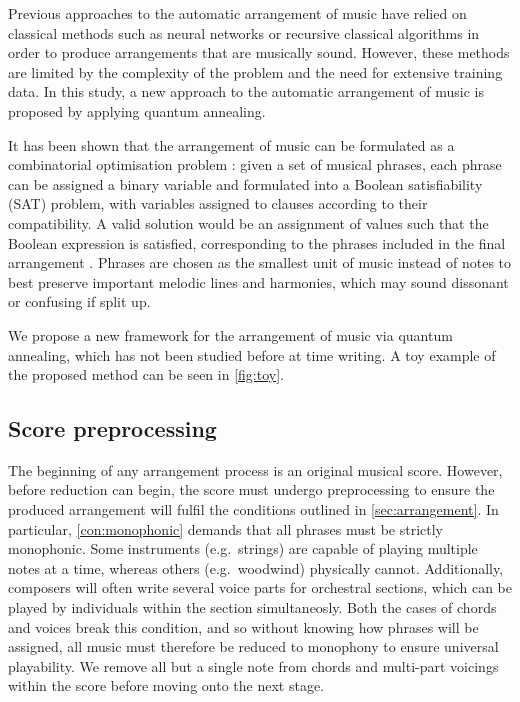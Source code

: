 \documentclass[12pt]{article}
\theoremstyle{definition}
\begin{document}
Previous approaches to the automatic arrangement of music have relied on classical methods such as neural networks  or recursive classical algorithms in order to produce arrangements that are musically sound. However, these methods are limited by the complexity of the problem and the need for extensive training data. In this study, a new approach to the automatic arrangement of music is proposed by applying quantum annealing.

It has been shown that the arrangement of music can be formulated as a combinatorial optimisation problem \cite{moses_computational_2016}: given a set of musical phrases, each phrase can be assigned a binary variable and formulated into a Boolean satisfiability (SAT) problem, with variables assigned to clauses according to their compatibility. A valid solution would be an assignment of values such that the Boolean expression is satisfied, corresponding to the phrases included in the final arrangement . Phrases are chosen as the smallest unit of music instead of notes to best preserve important melodic lines and harmonies, which may sound dissonant or confusing if split up.


We propose a new framework for the arrangement of music via quantum annealing, which has not been studied before at time writing. A toy example of the proposed method can be seen in \cref{fig:toy}.

\subsection{Score preprocessing}

The beginning of any arrangement process is an original musical score. However, before reduction can begin, the score must undergo preprocessing to ensure the produced arrangement will fulfil the conditions outlined in \cref{sec:arrangement}. In particular, \cref{con:monophonic} demands that all phrases must be strictly monophonic. Some instruments (e.g.\ strings) are capable of playing multiple notes at a time, whereas others (e.g.\ woodwind) physically cannot. Additionally, composers will often write several voice parts for orchestral sections, which can be played by individuals within the section simultaneosly. Both the cases of chords and voices break this condition, and so without knowing how phrases will be assigned, all music must therefore be reduced to monophony to ensure universal playability. We remove all but a single note from chords and multi-part voicings within the score before moving onto the next stage.
\end{document}
